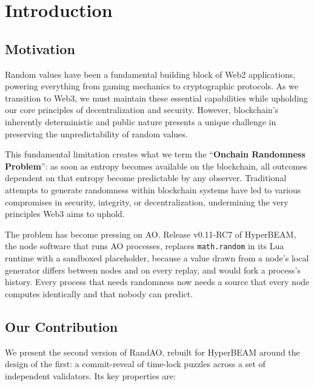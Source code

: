 \section{Introduction}\label{sec:introduction}


\subsection{Motivation}\label{sec:motivation}

Random values have been a fundamental building block of Web2 applications, powering everything from gaming mechanics to cryptographic protocols. As we transition to Web3, we must maintain these essential capabilities while upholding our core principles of decentralization and security. However, blockchain's inherently deterministic and public nature presents a unique challenge in preserving the unpredictability of random values.

This fundamental limitation creates what we term the ``\textbf{Onchain Randomness Problem}'': as soon as entropy becomes available on the blockchain, all outcomes dependent on that entropy become predictable by any observer. Traditional attempts to generate randomness within blockchain systems have led to various compromises in security, integrity, or decentralization, undermining the very principles Web3 aims to uphold.

The problem has become pressing on AO. Release v0.11-RC7 of HyperBEAM, the node software that runs AO processes, replaces \texttt{math.random} in its Lua runtime with a sandboxed placeholder, because a value drawn from a node's local generator differs between nodes and on every replay, and would fork a process's history. Every process that needs randomness now needs a source that every node computes identically and that nobody can predict.

\subsection{Our Contribution}\label{sec:our_contribution}

We present the second version of RandAO, rebuilt for HyperBEAM around the design of the first: a commit-reveal of time-lock puzzles across a set of independent validators. Its key properties are:

